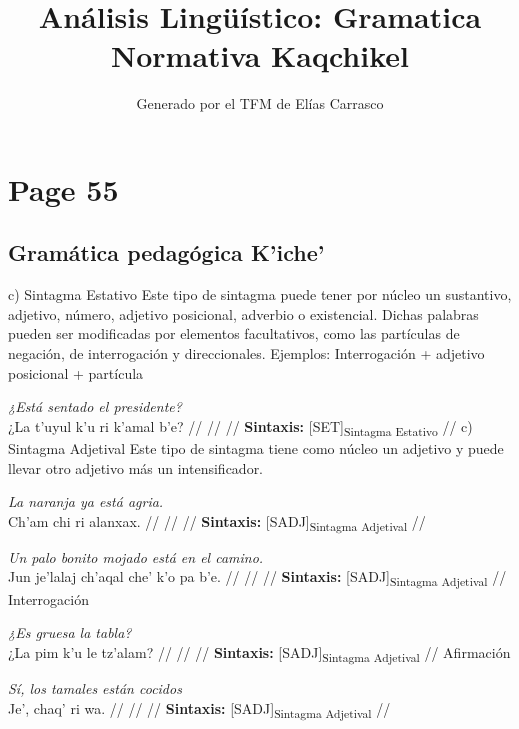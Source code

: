 \documentclass{article}%
\title{Análisis Lingüístico: Gramatica Normativa Kaqchikel}%
\author{Generado por el TFM de Elías Carrasco}%
\begin{document}
%
\normalsize%
\maketitle%
\section{Page 55}%
\label{sec:Page55}%
\subsection{Gramática pedagógica K’iche’}%
\label{subsec:GramticapedaggicaKiche}%

%
c) Sintagma Estativo %
Este tipo de sintagma puede tener por núcleo un sustantivo, adjetivo, número, adjetivo posicional, adverbio o existencial. Dichas palabras pueden ser modificadas por elementos facultativos, como las partículas de negación, de interrogación y direccionales. Ejemplos: %
Interrogación + adjetivo posicional + partícula %
\par\medskip%
\ex
\textit{¿Está sentado el presidente?} \\
\begingl
\gla ¿La t’uyul k’u ri k’amal b’e? //
\glb  //
\glc  //
\glft \textbf{Sintaxis:} [SET]\textsubscript{Sintagma Estativo} //
\endgl
\xe
%
\medskip%
c) Sintagma Adjetival %
Este tipo de sintagma tiene como núcleo un adjetivo y puede llevar otro adjetivo más un intensificador. %
\par\medskip%
\ex
\textit{La naranja ya está agria.} \\
\begingl
\gla Ch’am chi ri alanxax. //
\glb  //
\glc  //
\glft \textbf{Sintaxis:} [SADJ]\textsubscript{Sintagma Adjetival} //
\endgl
\xe
%
\medskip%
\par\medskip%
\ex
\textit{Un palo bonito mojado está en el camino.} \\
\begingl
\gla Jun je’lalaj ch’aqal che’ k’o pa b’e. //
\glb  //
\glc  //
\glft \textbf{Sintaxis:} [SADJ]\textsubscript{Sintagma Adjetival} //
\endgl
\xe
%
\medskip%
Interrogación %
\par\medskip%
\ex
\textit{¿Es gruesa la tabla?} \\
\begingl
\gla ¿La pim k’u le tz’alam? //
\glb  //
\glc  //
\glft \textbf{Sintaxis:} [SADJ]\textsubscript{Sintagma Adjetival} //
\endgl
\xe
%
\medskip%
Afirmación %
\par\medskip%
\ex
\textit{Sí, los tamales están cocidos} \\
\begingl
\gla Je’, chaq’ ri wa. //
\glb  //
\glc  //
\glft \textbf{Sintaxis:} [SADJ]\textsubscript{Sintagma Adjetival} //
\end{document}
